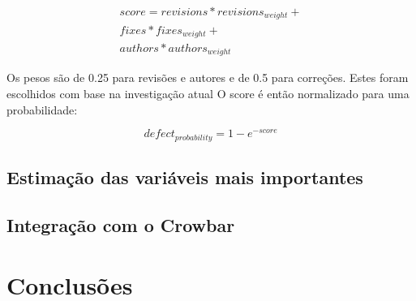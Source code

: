 \documentclass[9pt,a4paper]{extarticle}
\begin{document}
\begin{multicols}{2}
\begin{equation}
  \begin{split}
score =
revisions * revisions_{weight} + \\
fixes * fixes_{weight} + \\
authors * authors_{weight}
\end{split}
\end{equation}

Os pesos são de 0.25 para revisões e autores e de 0.5 para correções. Estes foram
escolhidos com base na investigação atual
\cite{859533, Zimmermann:2007:PDE:1268984.1269057, Moser:2008:CAE:1368088.1368114,D'Ambros:2012:EDP:2318097.2318149}
O score é então normalizado para uma probabilidade:

\begin{equation}
defect_{probability} = 1 - e^{-score}
\end{equation}

\subsection{Estimação das variáveis mais importantes}


\subsection{Integração com o Crowbar}



\section{Conclusões}\label{sec:conclui}



\end{multicols}
\end{document}
